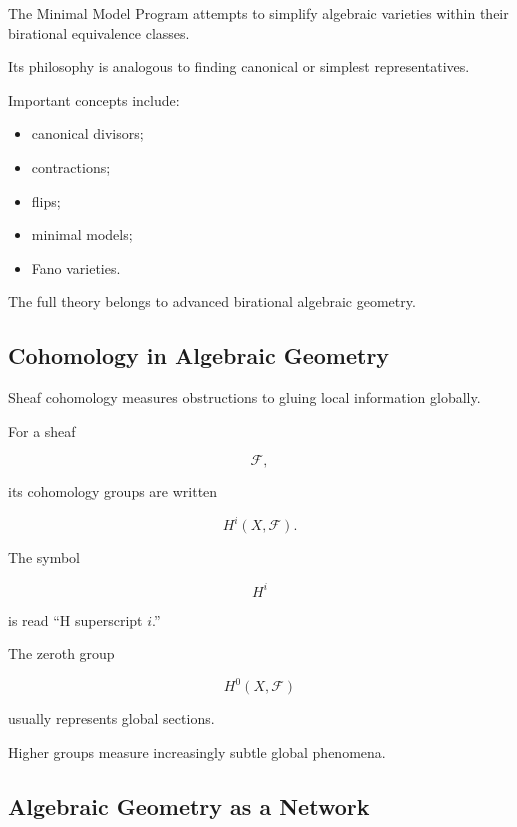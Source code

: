 The Minimal Model Program attempts to simplify algebraic varieties within
their birational equivalence classes.

Its philosophy is analogous to finding canonical or simplest
representatives.

Important concepts include:

\begin{itemize}
    \item canonical divisors;
    \item contractions;
    \item flips;
    \item minimal models;
    \item Fano varieties.
\end{itemize}

The full theory belongs to advanced birational algebraic geometry.

\subsection{Cohomology in Algebraic Geometry}
\label{subsec:algebraic-cohomology-preview}

Sheaf cohomology measures obstructions to gluing local information globally.

For a sheaf

\[
\mathcal{F},
\]

its cohomology groups are written

\[
\boxed{
H^i(X,\mathcal{F}).
}
\]

The symbol

\[
H^i
\]

is read ``H superscript \(i\).''

The zeroth group

\[
H^0(X,\mathcal{F})
\]

usually represents global sections.

Higher groups measure increasingly subtle global phenomena.

\subsection{Algebraic Geometry as a Network}
\label{subsec:algebraic-geometry-network}

